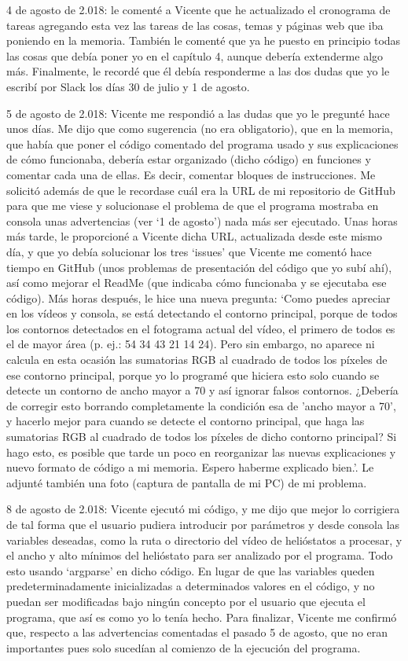 \documentclass[12pt]{article}
\begin{document}
4 de agosto de 2.018: le comenté a Vicente que he actualizado el cronograma de tareas agregando esta vez las tareas de las cosas, temas y páginas web que iba poniendo en la memoria. También le comenté que ya he puesto en principio todas las cosas que debía poner yo en el capítulo 4, aunque debería extenderme algo más. Finalmente, le recordé que él debía responderme a las dos dudas que yo le escribí por Slack los días 30 de julio y 1 de agosto.

5 de agosto de 2.018: Vicente me respondió a las dudas que yo le pregunté hace unos días. Me dijo que como sugerencia (no era obligatorio), que en la memoria, que había que poner el código comentado del programa usado y sus explicaciones de cómo funcionaba, debería estar organizado (dicho código) en funciones y comentar cada una de ellas. Es decir, comentar bloques de instrucciones. Me solicitó además de que le recordase cuál era la URL de mi repositorio de GitHub para que me viese y solucionase el problema de que el programa mostraba en consola unas advertencias (ver ‘1 de agosto’) nada más ser ejecutado. Unas horas más tarde, le proporcioné a Vicente dicha URL, actualizada desde este mismo día, y que yo debía solucionar los tres ‘issues’ que Vicente me comentó hace tiempo en GitHub (unos problemas de presentación del código que yo subí ahí), así como mejorar el ReadMe (que indicaba cómo funcionaba y se ejecutaba ese código). Más horas después, le hice una nueva pregunta: ‘Como puedes apreciar en los vídeos y consola, se está detectando el contorno principal, porque de todos los contornos detectados en el fotograma actual del vídeo, el primero de todos es el de mayor área (p. ej.: 54 34 43 21 14 24). Pero sin embargo, no aparece ni calcula en esta ocasión las sumatorias RGB al cuadrado de todos los píxeles de ese contorno principal, porque yo lo programé que hiciera esto solo cuando se detecte un contorno de ancho mayor a 70 y así ignorar falsos contornos. ¿Debería de corregir esto borrando completamente la condición esa de 'ancho mayor a 70', y hacerlo mejor para cuando se detecte el contorno principal, que haga las sumatorias RGB al cuadrado de todos los píxeles de dicho contorno principal? Si hago esto, es posible que tarde un poco en reorganizar las nuevas explicaciones y nuevo formato de código a mi memoria. Espero haberme explicado bien.’. Le adjunté también una foto (captura de pantalla de mi PC) de mi problema.

8 de agosto de 2.018: Vicente ejecutó mi código, y me dijo que mejor lo corrigiera de tal forma que el usuario pudiera introducir por parámetros y desde consola las variables deseadas, como la ruta o directorio del vídeo de helióstatos a procesar, y el ancho y alto mínimos del helióstato para ser analizado por el programa. Todo esto usando ‘argparse’ en dicho código. En lugar de que las variables queden predeterminadamente inicializadas a determinados valores en el código, y no puedan ser modificadas bajo ningún concepto por el usuario que ejecuta el programa, que así es como yo lo tenía hecho. Para finalizar, Vicente me confirmó que, respecto a las advertencias comentadas el pasado 5 de agosto, que no eran importantes pues solo sucedían al comienzo de la ejecución del programa.
\end{document}
